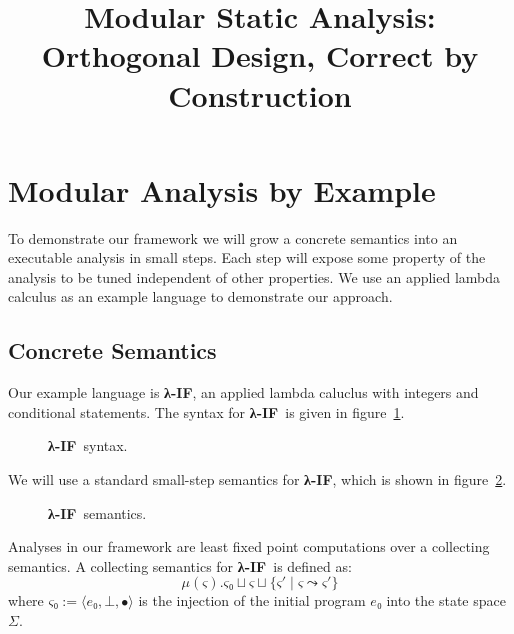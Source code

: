 \documentclass[pldi]{sigplanconf}
\makeatletter
\newcommand{\lamif}{\textbf{λ-IF}\@}
\newcommand{\steps}{\leadsto}
\newcommand{\st}{\;|\;}
\makeatother
\begin{document}
\title{Modular Static Analysis: Orthogonal Design, Correct by Construction}
\maketitle




\section{Modular Analysis by Example}

To demonstrate our framework we will grow a concrete semantics into an executable analysis in small steps.
Each step will expose some property of the analysis to be tuned independent of other properties.
We use an applied lambda calculus as an example language to demonstrate our approach.

\subsection{Concrete Semantics}

Our example language is \lamif, an applied lambda caluclus with integers and conditional statements.
The syntax for \lamif\ is given in figure~\ref{lamif:syntax}.

\begin{figure}[t]
\caption{\lamif\ syntax.}
\label{lamif:syntax}

\end{figure}

We will use a standard small-step semantics for \lamif, which is shown in figure~\ref{lamif:semantics}.

\begin{figure}[t]
\caption{\lamif\ semantics.}
\label{lamif:semantics}

\end{figure}

Analyses in our framework are least fixed point computations over a collecting semantics.
A collecting semantics for \lamif\ is defined as:
\begin{equation*}
  μ(ς). ς₀ ⊔ ς ⊔ \{ ς' \st ς \steps ς' \}
\end{equation*}
where $ς₀ := ⟨ e₀ , ⊥ , ∙ ⟩$ is the injection of the initial program $e₀$ into the state space $Σ$.
\end{document}
